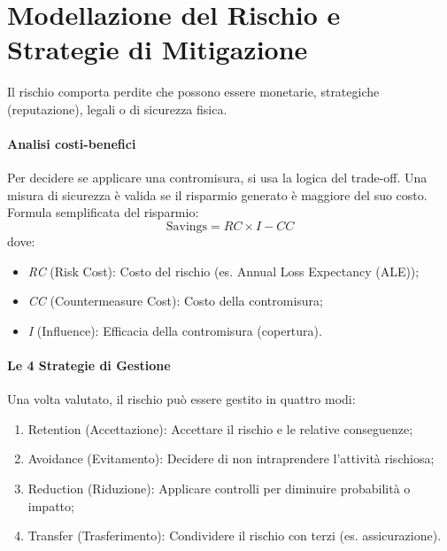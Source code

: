 %
\section{Modellazione del Rischio e Strategie di Mitigazione}
Il rischio comporta perdite che possono essere monetarie, strategiche (reputazione), legali o di sicurezza fisica.
%
\paragraph{Analisi costi-benefici} Per decidere se applicare una contromisura, si usa la logica del trade-off. Una misura di sicurezza è valida se il risparmio generato è maggiore del suo costo. Formula semplificata del risparmio:
\[
    \text{Savings} = RC \times I - CC
\]
dove:
\begin{itemize}
    \item \emph{RC} (Risk Cost): Costo del rischio (es. Annual Loss Expectancy (ALE));
    \item \emph{CC} (Countermeasure Cost): Costo della contromisura;
    \item \emph{I} (Influence): Efficacia della contromisura (copertura).
\end{itemize}

%
\paragraph{Le 4 Strategie di Gestione}
Una volta valutato, il rischio può essere gestito in quattro modi:
\begin{enumerate}
    \item Retention (Accettazione): Accettare il rischio e le relative conseguenze;
    \item Avoidance (Evitamento): Decidere di non intraprendere l'attività rischiosa;
    \item Reduction (Riduzione): Applicare controlli per diminuire probabilità o impatto;
    \item Transfer (Trasferimento): Condividere il rischio con terzi (es. assicurazione).
\end{enumerate}

%
